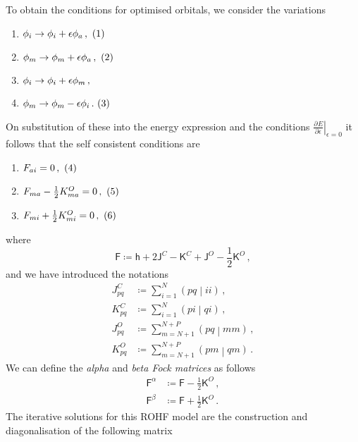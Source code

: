 \documentclass{article}
\theoremstyle{plain}\theoremheaderfont{\normalfont\itshape}\theorembodyfont{\rmfamily}\theoremseparator{.}\newtheorem*{rem}{Remark}\newtheorem*{ex}{Example}\newtheorem*{proof}{Proof}\newtheorem*{altp}{Alternative proof}
\theoremstyle{plain}\theoremheaderfont{\normalfont\bfseries}\theorembodyfont{\rmfamily}\theoremseparator{.}\newtheorem{thm}{Theorem}[section]\newtheorem{lem}[thm]{Lemma}\newtheorem{prop}[thm]{Proposition}\newtheorem*{cor}{Corollary}\newtheorem{defn}[thm]{Definition}\newtheorem{clm}[thm]{Claim}\newtheorem{clminproof}{Claim}
\theoremstyle{break}\theoremheaderfont{\normalfont\itshape}\theorembodyfont{\rmfamily}\theoremseparator{.\medskip}\newtheorem*{proofskip}{Proof}\newtheorem*{exs}{Examples}\newtheorem*{rems}{Remarks}
\theoremstyle{break}\theoremheaderfont{\normalfont\bfseries}\theorembodyfont{\rmfamily}\theoremseparator{.\medskip}\newtheorem{lemskip}[thm]{Lemma}\newtheorem{defnskip}[thm]{Definition}\newtheorem{propskip}[thm]{Proposition}\newtheorem{thmskip}[thm]{Theorem}
\numberwithin{equation}{section}
\newcommand{\pdv}[3][]{\frac{\partial^{#1} #2}{{\partial #3}^{#1}}}
\newcommand{\bracket}[2]{\left( #1 \middle| #2 \right)}
\newcommand{\inlineeqno}{\hfill\stepcounter{equation}\ (\theequation)}
\begin{document}
    To obtain the conditions for optimised orbitals, we consider the variations
    \begin{enumerate}[topsep=0pt,label=(\roman*)]
        \item \hfill \(\phi_i\to\phi_i+\epsilon\phi_a\,,\inlineeqno\)
        \item \hfill \(\phi_m\to\phi_m+\epsilon\phi_a\,,\inlineeqno\)
        \item \hfill \(\phi_i\to\phi_i+\epsilon\phi_m\,,\hfill\qquad\ \,\)
        \item[] \hfill \(\phi_m\to\phi_m-\epsilon\phi_i\,.\inlineeqno\)
    \end{enumerate}
    On substitution of these into the energy expression and the conditions \(\left.\pdv{E}{\epsilon}\right|_{\epsilon=0}\) it follows that the self consistent conditions are
    \begin{enumerate}[topsep=0pt,label=(\roman*)]
        \item \hfill \(F_{ai}=0\,,\inlineeqno\)
        \item \hfill \(F_{ma}-\frac{1}{2}K_{ma}^{O}=0\,,\inlineeqno\)
        \item \hfill \(F_{mi}+\frac{1}{2}K_{mi}^{O}=0\,,\inlineeqno\)
    \end{enumerate}
    where
    \begin{equation}
        \mathsf{F}\coloneqq\mathsf{h}+2\mathsf{J}^C-\mathsf{K}^C+\mathsf{J}^O-\frac{1}{2}\mathsf{K}^O\,,
    \end{equation}
    and we have introduced the notations
    \begin{align}
        J_{pq}^C&\coloneqq\sum_{i=1}^{N}\bracket{pq}{ii}\,,\\
        K_{pq}^C&\coloneqq\sum_{i=1}^{N}\bracket{pi}{qi}\,,\\
        J_{pq}^O&\coloneqq\sum_{m=N+1}^{N+P}\bracket{pq}{mm}\,,\\
        K_{pq}^O&\coloneqq\sum_{m=N+1}^{N+P}\bracket{pm}{qm}\,.
    \end{align}
    We can define the \textit{alpha} and \textit{beta Fock matrices} as follows
    \begin{align}
        \mathsf{F}^{\alpha}&\coloneqq\mathsf{F}-\frac{1}{2}\mathsf{K}^O\,,\\
        \mathsf{F}^{\beta}&\coloneqq\mathsf{F}+\frac{1}{2}\mathsf{K}^O\,.
    \end{align}
    The iterative solutions for this ROHF model are the construction and diagonalisation of the following matrix
\end{document}
